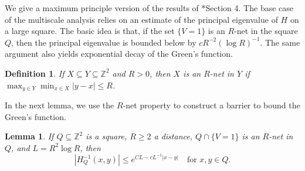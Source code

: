 \documentclass{amsart}
\newtheorem{lemma}[equation]{Lemma}
\newtheorem{definition}[equation]{Definition}
\numberwithin{equation}{section}
\numberwithin{figure}{section}
\newcommand{\Z}{\mathbb{Z}}
\begin{document}
We give a maximum principle version of the results of \cite{Bourgain-Kenig}*{Section 4}.  The base case of the multiscale analysis relies on an estimate of the principal eigenvalue of $H$ on a large square.  The basic idea is that, if the set $\{ V = 1 \}$ is an $R$-net in the square $Q$, then the principal eigenvalue is bounded below by $c R^{-2} (\log R)^{-1}$.  The same argument also yields exponential decay of the Green's function.

\begin{definition}
If $X \subseteq Y \subseteq \Z^2$ and $R > 0$, then $X$ is an $R$-net in $Y$ if $\max_{y \in Y} \min_{x \in X} |y - x| \leq R$.
\end{definition}

In the next lemma, we use the $R$-net property to construct a barrier to bound the Green's function.

\begin{lemma}
\label{l.principal}
If $Q \subseteq \Z^2$ is a square, $R \geq 2$ a distance, $Q \cap \{ V = 1 \}$ is an $R$-net in $Q$, and $L = R^2 \log R$, then
\begin{equation*}
|H_Q^{-1}(x,y)| \leq e^{C L - c L^{-1} |x-y|} \quad \mbox{for } x, y \in Q.
\end{equation*}
\end{lemma}
\end{document}
